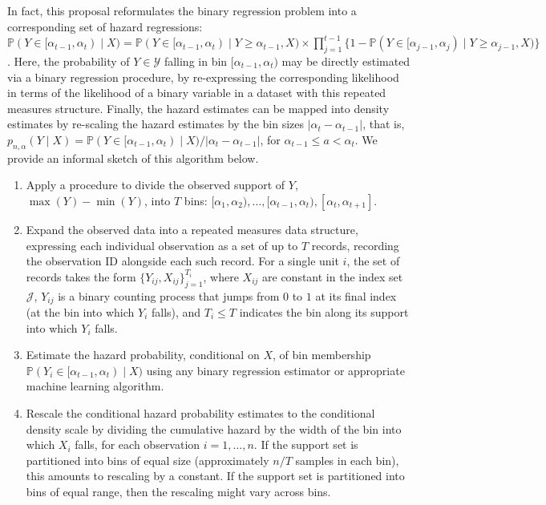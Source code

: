 \documentclass[
  12pt, krantz2,
]{krantz}
\providecommand{\tightlist}{%
  \setlength{\itemsep}{0pt}\setlength{\parskip}{0pt}}
\newcommand{\1}{\mathbbm{1}}
\theoremstyle{definition}
\theoremstyle{definition}
\theoremstyle{definition}
\theoremstyle{definition}
\theoremstyle{remark}
\begin{document}
In fact, this proposal reformulates the binary regression problem into a
corresponding set of hazard regressions: \(\mathbb{P} (Y \in [\alpha_{t-1}, \alpha_t) \mid X) = \mathbb{P} (Y \in [\alpha_{t-1}, \alpha_t) \mid Y \geq \alpha_{t-1}, X) \times \prod_{j = 1}^{t -1} \{1 - \mathbb{P} (Y \in [\alpha_{j-1}, \alpha_j) \mid Y \geq \alpha_{j-1}, X) \}\). Here, the probability
of \(Y \in \mathcal{Y}\) falling in bin \([\alpha_{t-1}, \alpha_t)\) may be directly
estimated via a binary regression procedure, by re-expressing the corresponding
likelihood in terms of the likelihood of a binary variable in a dataset with
this repeated measures structure. Finally, the hazard estimates can be mapped into
density estimates by re-scaling the hazard estimates by the bin sizes \(\lvert \alpha_t - \alpha_{t-1} \rvert\), that is, \(p_{n, \alpha}(Y \mid X) = \mathbb{P}(Y \in [\alpha_{t-1}, \alpha_t) \mid X) / \lvert \alpha_t - \alpha_{t-1} \rvert\), for \(\alpha_{t-1} \leq a < \alpha_t\). We provide an
informal sketch of this algorithm below.

\begin{enumerate}
\def\labelenumi{\arabic{enumi}.}
\tightlist
\item
  Apply a procedure to divide the observed support of \(Y\), \(\max(Y) - \min(Y)\),
  into \(T\) bins: \([\alpha_1, \alpha_2), \ldots, [\alpha_{t-1}, \alpha_t), [\alpha_t, \alpha_{t+1}]\).
\item
  Expand the observed data into a repeated measures data structure, expressing
  each individual observation as a set of up to \(T\) records, recording the
  observation ID alongside each such record. For a single unit \(i\), the set of
  records takes the form \(\{Y_{ij}, X_{ij}\}_{j=1}^{T_i}\), where \(X_{ij}\) are
  constant in the index set \(\mathcal{J}\), \(Y_{ij}\) is a binary counting
  process that jumps from \(0\) to \(1\) at its final index (at the bin into which
  \(Y_i\) falls), and \(T_i \leq T\) indicates the bin along its support into which
  \(Y_i\) falls.
\item
  Estimate the hazard probability, conditional on \(X\), of bin membership
  \(\mathbb{P}(Y_i \in [\alpha_{t-1}, \alpha_t) \mid X)\) using any binary
  regression estimator or appropriate machine learning algorithm.
\item
  Rescale the conditional hazard probability estimates to the conditional
  density scale by dividing the cumulative hazard by the width of the bin into
  which \(X_i\) falls, for each observation \(i = 1, \ldots, n\). If the support
  set is partitioned into bins of equal size (approximately \(n/T\) samples in
  each bin), this amounts to rescaling by a constant. If the support set is
  partitioned into bins of equal range, then the rescaling might vary across
  bins.
\end{enumerate}
\end{document}
